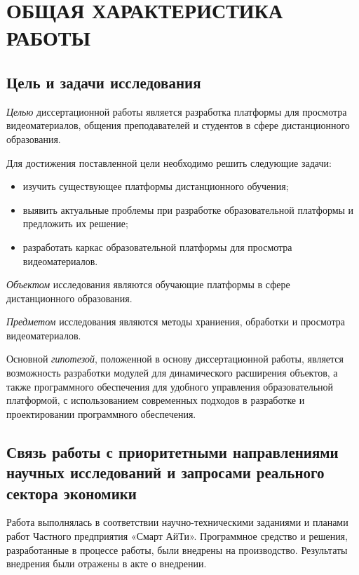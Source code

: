 \section*{ОБЩАЯ ХАРАКТЕРИСТИКА РАБОТЫ}

\subsection*{Цель и задачи исследования}

\textit{Целью} диссертационной работы является разработка платформы для просмотра видеоматериалов,
общения преподавателей и студентов в сфере дистанционного образования.

Для достижения поставленной цели необходимо решить следующие задачи:
\begin{itemize}[wide,topsep=0pt]
  \itemsep0em
  \item изучить существующее платформы дистанционного обучения;
  \item выявить актуальные проблемы при разработке образовательной платформы и предложить их решение;
  \item разработать каркас образовательной платформы для просмотра видеоматериалов.
\end{itemize}

\textit{Объектом} исследования являются обучающие платформы в сфере дистанционного образования.


\textit{Предметом} исследования являются методы храниения, обработки и просмотра видеоматериалов.

Основной \textit{гипотезой}, положенной в основу диссертационной работы, является возможность разработки
модулей для динамического расширения объектов, а также программного обеспечения для удобного
управления образовательной платформой, с использованием современных подходов в разработке
и проектировании программного обеспечения.

\subsection*{Связь работы с приоритетными направлениями научных исследований и запросами реального сектора
экономики}

Работа выполнялась в соответствии научно-техническими заданиями и планами работ
Частного предприятия «Смарт АйТи». Программное средство и решения, разработанные в процессе работы,
были внедрены на производство. Результаты внедрения были отражены в акте о внедрении.

